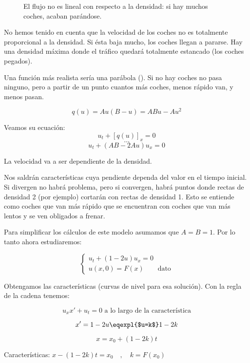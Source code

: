 		\begin{wrapfigure}{r}{0.4\textwidth}
			\centering
			\caption{El flujo no es lineal con respecto a la densidad: si hay muchos coches, acaban parándose.}
			\label{fig:parabola}
		\end{wrapfigure}

		No hemos tenido en cuenta que la velocidad de los coches no es totalmente proporcional a la densidad. Si ésta baja mucho, los coches llegan a pararse. Hay una densidad máxima donde el tráfico quedará totalmente estancado (los coches pegados).

		Una función más realista sería una parábola (). Si no hay coches no pasa ninguno, pero a partir de un punto cuantos más coches, menos rápido van, y menos pasan.

		$$ q(u) = Au (B-u) = ABu - Au^{2} $$

		Veamos su ecuación:
		$$u_t + [q(u)]_x = 0$$
		$$ … $$
		$$ u_t + (AB - 2Au) u_x = 0 $$

		La velocidad va a ser dependiente de la densidad.

		Nos saldrán características cuya pendiente dependa del valor en el tiempo inicial. Si divergen no habrá problema, pero si convergen, habrá puntos donde rectas de densidad 2 (por ejemplo) cortarán con rectas de densidad 1. Esto se entiende como coches que van más rápido que se encuentran con coches que van más lentos y se ven obligados a frenar.


		Para simplificar los cálculos de este modelo asumamos que $A = B = 1$. Por lo tanto ahora estudiaremos:

		\begin{equation*}
			\left\{
			\begin{array}{l}
				u_t + (1-2u)u_{x} = 0 \\
				u(x, 0) = F(x) \quad \quad \text{dato}
			\end{array}
			\right.
		\end{equation*}

		Obtengamos las características (curvas de nivel para esa solución). Con la regla de la cadena tenemos:

		$$u_x x' + u_t = 0 \text{ a lo largo de la característica}$$

		$$x' = 1 - 2u \eqexpl{$u=k$} 1 - 2k$$

		$$x = x_0 + (1-2k)t$$

		Características:
		\( x - (1-2k)t = x_0\quad,\quad k=F(x_0)  \label{eq:caracteristicas_realistas} \)

